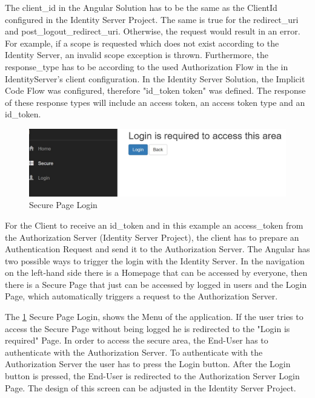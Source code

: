 The client\_id in the Angular Solution has to be the same as the ClientId configured in the Identity Server Project. The same is true for the redirect\_uri and post\_logout\_redirect\_uri. Otherwise, the request would result in an error. For example, if a scope is requested which does not exist according to the Identity Server, an invalid scope exception is thrown. Furthermore, the response\_type has to be according to the used Authorization Flow in the in IdentityServer's client configuration. In the Identity Server Solution, the  Implicit Code Flow was configured, therefore "id\_token token" was defined. The response of these response types will include an access token, an access token type and an id\_token.  

\begin{figure}[h]
	\centering
	\includegraphics[width=0.8\linewidth]{images/secure_page_requires_login}
	\caption{Secure Page Login}
	\label{fig:securepagerequireslogin}
\end{figure}

For the Client to receive an id\_token and in this example an access\_token from the Authorization Server (Identity Server Project), the client has to prepare an Authentication Request and send it to the Authorization Server. The Angular has two possible ways to trigger the login with the Identity Server. In the navigation on the left-hand side there is a Homepage that can be accessed by everyone, then there is a Secure Page that just can be accessed by logged in users and the Login Page, which automatically triggers a request to the Authorization Server.



The \ref{fig:securepagerequireslogin} Secure Page Login, shows the Menu of the application. If the user tries to access the Secure Page without being logged he is redirected to the "Login is required" Page. In order to access the secure area, the End-User has to authenticate with the Authorization Server.
To authenticate with the Authorization Server the user has to press the Login button. After the Login button is pressed, the End-User is redirected to the Authorization Server Login Page. The design of this screen can be adjusted in the Identity Server Project. 

